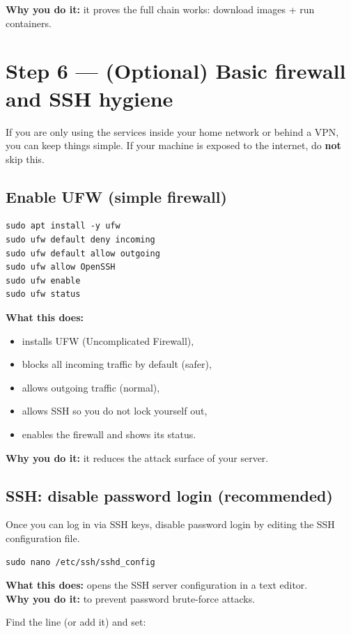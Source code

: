 \textbf{Why you do it:} it proves the full chain works: download images + run containers.

\section{Step 6 --- (Optional) Basic firewall and SSH hygiene}
If you are only using the services inside your home network or behind a VPN, you can keep things simple.
If your machine is exposed to the internet, do \textbf{not} skip this.

\subsection{Enable UFW (simple firewall)}
\begin{lstlisting}
sudo apt install -y ufw
sudo ufw default deny incoming
sudo ufw default allow outgoing
sudo ufw allow OpenSSH
sudo ufw enable
sudo ufw status
\end{lstlisting}

\textbf{What this does:}
\begin{itemize}[leftmargin=*]
  \item installs UFW (Uncomplicated Firewall),
  \item blocks all incoming traffic by default (safer),
  \item allows outgoing traffic (normal),
  \item allows SSH so you do not lock yourself out,
  \item enables the firewall and shows its status.
\end{itemize}

\textbf{Why you do it:} it reduces the attack surface of your server.

\subsection{SSH: disable password login (recommended)}
Once you can log in via SSH keys, disable password login by editing the SSH configuration file.

\begin{lstlisting}
sudo nano /etc/ssh/sshd_config
\end{lstlisting}

\textbf{What this does:} opens the SSH server configuration in a text editor. \\
\textbf{Why you do it:} to prevent password brute-force attacks.

Find the line (or add it) and set:

